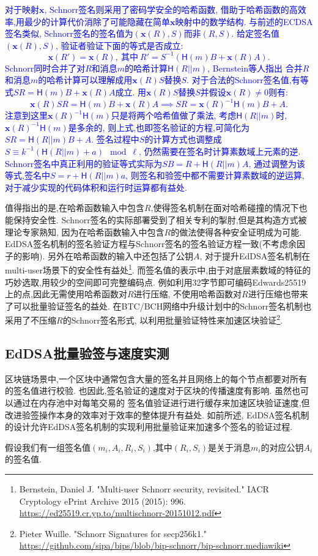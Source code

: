 \textcolor{blue}{
对于映射$\mathbf{x}$, Schnorr签名则采用了密码学安全的哈希函数,
借助于哈希函数的高效率,用最少的计算代价消除了可能隐藏在简单$\mathbf{x}$映射中的数学结构.
与前述的ECDSA签名类似, Schnorr签名的签名值为$(\mathbf{x}(R), S)$而非$(R,S)$.
给定签名值$(\mathbf{x}(R), S)$, 验证者验证下面的等式是否成立:
$$\mathbf{x}(R') = \mathbf{x}(R),\ \text{其中}\ R' = S^{-1}(\textsf{H}(m)B + \mathbf{x}(R)A) .$$
Schnorr同时合并了对$R$和消息$m$的哈希计算$\textsf{H}(R||m)$, Bernstein等人指出
合并$R$和消息$m$的哈希计算可以理解成用$\mathbf{x}(R)S$替换$S$.
对于合法的Schnorr签名值,有等式$SR = \textsf{H}(m)B + \mathbf{x}(R)A$成立.
用$\mathbf{x}(R)S$替换$S$并假设$\mathbf{x}(R)\neq0$则有:
$$\mathbf{x}(R)SR = \textsf{H}(m)B + \mathbf{x}(R)A \implies 
SR = \mathbf{x}(R)^{-1}\textsf{H}(m)B + A.$$
注意到这里$\mathbf{x}(R)^{-1}\textsf{H}(m)$只是将两个哈希值做了乘法,
考虑$\textsf{H}(R||m)$时, $\mathbf{x}(R)^{-1}\textsf{H}(m)$是多余的,
则上式,也即签名验证的方程,可简化为$SR = \textsf{H}(R||m)B + A$.
签名过程中$S$的计算方式也调整成$S \equiv k^{-1}(\textsf{H}(R||m) + a) \mod \ell$,
仍然需要在签名时计算素数域上元素的逆.
Schnorr签名中真正利用的验证等式实际为$SB = R+ \textsf{H}(R||m)A$,
通过调整为该等式,签名中$S = r + \textsf{H}(R||m) a$, 则签名和验签中都不需要计算素数域的逆运算,
对于减少实现的代码体积和运行时运算都有益处.
}

值得指出的是,在哈希函数输入中包含$R$,使得签名机制在面对哈希碰撞的情况下也能保持安全性.
Schnorr签名的实际部署受到了相关专利的掣肘,但是其构造方式被理论专家熟知,
因为在哈希函数输入中包含$R$的做法使得各种安全证明成为可能.
EdDSA签名机制的签名验证方程与Schnorr签名的签名验证方程一致(不考虑余因子的影响).
另外在哈希函数的输入中还包括了公钥$A$, 
对于提升EdDSA签名机制在multi-user场景下的安全性有益处\footnote{
Bernstein, Daniel J. "Multi-user Schnorr security, revisited." 
IACR Cryptology ePrint Archive 2015 (2015): 996.
\url{https://ed25519.cr.yp.to/multischnorr-20151012.pdf}}.
而签名值的表示中,由于对底层素数域的特征的巧妙选取,用较少的空间即可完整编码点.
例如利用32字节即可编码Edwards25519上的点,因此无需使用哈希函数对$R$进行压缩,
不使用哈希函数对$R$进行压缩也带来了可以批量验证签名的益处.
在BTC/BCH网络中升级计划中的Schnorr签名机制也采用了不压缩$R$的Schnorr签名形式,
以利用批量验证特性来加速区块验证\footnote{
Pieter Wuille. "Schnorr Signatures for secp256k1."
\url{https://github.com/sipa/bips/blob/bip-schnorr/bip-schnorr.mediawiki}}.

\subsection{EdDSA批量验签与速度实测}

区块链场景中,一个区块中通常包含大量的签名并且网络上的每个节点都要对所有的签名值进行校验.
也因此,签名验证的速度对于区块的传播速度有影响. 虽然也可以通过在内存池中对每笔交易的
签名值验证进行进行缓存来加速区块验证速度,但改进验签操作本身的效率对于效率的整体提升有益处.
如前所述, EdDSA签名机制的设计允许EdDSA签名机制的实现利用批量验证来加速多个签名的验证过程.

假设我们有一组签名值$(m_i, A_i, R_i, S_i)$,其中$(R_i, S_i)$是关于消息$m_i$的对应公钥$A_i$的签名值.

